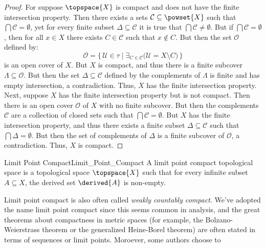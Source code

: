     \begin{proof}
        For suppose $\topspace{X}$ is compact and does not have the finite
        intersection property. Then there exists a sets
        $\mathcal{C}\subseteq\powset{X}$ such that
        $\bigcap\mathcal{C}=\emptyset$, yet for every finite subset
        $\Delta\subseteq\mathcal{C}$ it is true that
        $\bigcap\mathcal{C}\ne\emptyset$. But if
        $\bigcap\mathcal{C}=\emptyset$, then for all $x\in{X}$ there exists
        $C\in\mathcal{C}$ such that $x\notin{C}$. But then the set
        $\mathcal{O}$ defined by:
        \begin{equation}
            \mathcal{O}=\big\{\,\mathcal{U}\in\tau\;|\;
                \exists_{C\in\mathcal{C}}
                \big(\mathcal{U}=X\setminus{C}\big)\,\big\}
        \end{equation}
        is an open cover of $X$. But $X$ is compact, and thus there is a
        finite subcover $\Lambda\subseteq\mathcal{O}$. But then the set
        $\Delta\subseteq\mathcal{C}$ defined by the complements of $\Lambda$
        is finite and has empty intersection, a contradiction. Thus,
        $X$ has the finite intersection property. Next, suppose $X$ has the
        finite intersection property but is not compact. Then there is an
        open cover $\mathcal{O}$ of $X$ with no finite subcover. But
        then the complements $\mathcal{C}$ are a collection of closed sets
        such that $\bigcap\mathcal{C}=\emptyset$. But $X$ has the finite
        intersection property, and thus there exists a finite subset
        $\Delta\subseteq\mathcal{C}$ such that $\bigcap\Delta=\emptyset$.
        But then the set of complements of $\Delta$ is a finite subcover
        of $\mathcal{O}$, a contradiction. Thus, $X$ is compact.
    \end{proof}
    \begin{fdefinition}{Limit Point Compact}{Limit_Point_Compact}
        A limit point compact topological space is a topological space
        $\topspace{X}$ such that for every infinite subset $A\subseteq{X}$,
        the derived set $\derived{A}$ is non-empty.
    \end{fdefinition}
    Limit point compact is also often called
    \textit{weakly countably compact}. We've adopted the name limit point
    compact since this seems common in analysis, and the great theorems
    about compactness in metric spaces (for example, the Bolzano-Weierstrass
    theorem or the generalized Heine-Borel theorem) are often stated in
    terms of sequences or limit points. Moroever, some authors choose to

